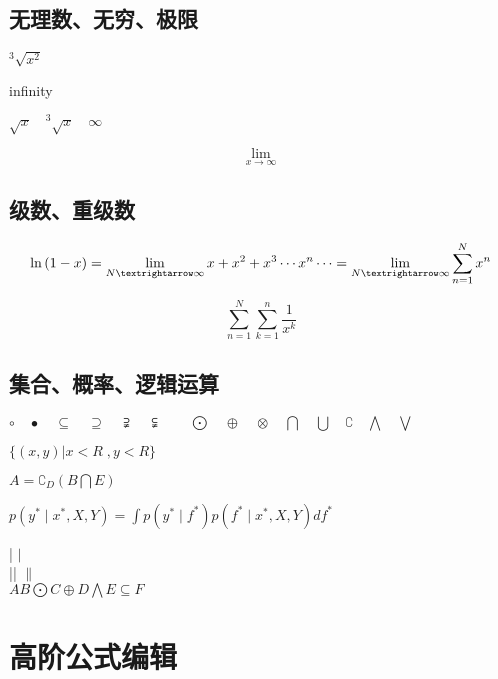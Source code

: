\documentclass[withoutpreface,bwprint]{cumcmthesis}  %
\begin{document}
	\subsection{无理数、无穷、极限}
	
		$^{3}\sqrt{x^{2}} $
		
		
		infinity
		
		$ \sqrt{x}  \quad ^3\sqrt{x}\quad \infty $
		
		\begin{equation}
			\lim_{x\rightarrow\infty}
		\end{equation}
	
	\subsection{级数、重级数}
		\begin{equation}
			\ln{(1-x)} =\lim_{N\textrightarrow\infty} x+x^{2}+x^{3} \cdots x^{n} \cdots  = \lim_{N\textrightarrow\infty}\sum_{n=1}^{N} x^n
		\end{equation}
	
		\begin{equation}
		\sum_{n=1}^{N} \sum_{k=1}^{n} \frac{1}{x^{k}}
		\end{equation}
		
	\subsection{集合、概率、逻辑运算}
		$	
			\circ \quad \bullet \quad\subseteq \quad \supseteq \quad \supsetneqq \quad \subsetneqq \quad \quad \bigodot  \quad \oplus \quad \otimes  \quad \bigcap \quad \bigcup \quad \complement  \quad \bigwedge \quad \bigvee
		$
		 
		 
		 $ 
		  \{(x,y) | x<R \;,y<R\}
		  $
		  
		 $ 
		  A = \complement_{D}(B \bigcap E)
		  $
		  
		   $ 
		   	p(y^{*}\mid x^{*},X,Y) = \int p(y^{*}\mid f^{*})p(f^{*}\mid x^{*},X,Y)df^{*}
		   $ 
		   
		   
		 |  $\mid $ \\
		 
		   ||  $\| $\\
		   
		   
		   $ 
		   	AB \bigodot C \oplus D \bigwedge E \subseteq F
		   $ 
		   
\section{高阶公式编辑}
\end{document}
